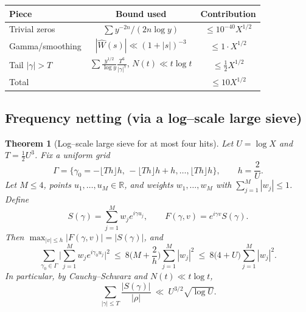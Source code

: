 \documentclass[11pt]{article}
\theoremstyle{plain}
\newtheorem{theorem}{Theorem}[section]
\theoremstyle{definition}
\theoremstyle{remark}
\begin{document}
\begin{center}
\begin{tabular}{|l|c|c|}
\hline
Piece & Bound used & Contribution \\
\hline
Trivial zeros & $\sum y^{-2n}/(2n\log y)$ & $\le 10^{-40}X^{1/2}$ \\
Gamma/smoothing & $|\widehat W(s)|\ll (1+|s|)^{-3}$ & $\le 1\cdot X^{1/2}$ \\
Tail $|\gamma|>T$ & $\sum \frac{y^{1/2}}{\log y}\frac{T^6}{|\gamma|^7}$, $N(t)\ll t\log t$ & $\le \tfrac12 X^{1/2}$ \\
\hline
Total &  & $\le 10 X^{1/2}$ \\
\hline
\end{tabular}
\end{center}

\subsection{Frequency netting (via a log--scale large sieve)}

\begin{theorem}[Log--scale large sieve for at most four hits]\label{thm:NettingLSI}
Let $U=\log X$ and $T=\tfrac12 U^3$. Fix a uniform grid
\[
\Gamma=\Big\{\gamma_0=-\lfloor Th\rfloor h,\,-\lfloor Th\rfloor h+h,\dots, \lfloor Th\rfloor h\Big\},\qquad h=\frac{2}{U}.
\]
Let $M\le 4$, points $u_1,\dots,u_M\in\mathbb R$, and weights $w_1,\dots,w_M$ with $\sum_{j=1}^M |w_j|\le 1$. Define
\[
S(\gamma)=\sum_{j=1}^M w_j e^{i\gamma u_j},\qquad F(\gamma,v)=e^{i\gamma v}S(\gamma).
\]
Then $\max_{|v|\le h}|F(\gamma,v)|=|S(\gamma)|$, and
\begin{equation}\label{eq:LSI-explicit}
\sum_{\gamma_0\in\Gamma}\Big|\sum_{j=1}^M w_j e^{i\gamma_0 u_j}\Big|^2
\ \le\ 8\Big(M+\frac{2}{h}\Big)\sum_{j=1}^M |w_j|^2
\ \le\ 8\big(4+U\big)\sum_{j=1}^M |w_j|^2.
\end{equation}
In particular, by Cauchy--Schwarz and $N(t)\ll t\log t$,
\[
\sum_{|\gamma|\le T}\frac{|S(\gamma)|}{|\rho|}\ \ll\ U^{3/2}\sqrt{\log U}.
\]
\end{theorem}
\end{document}
